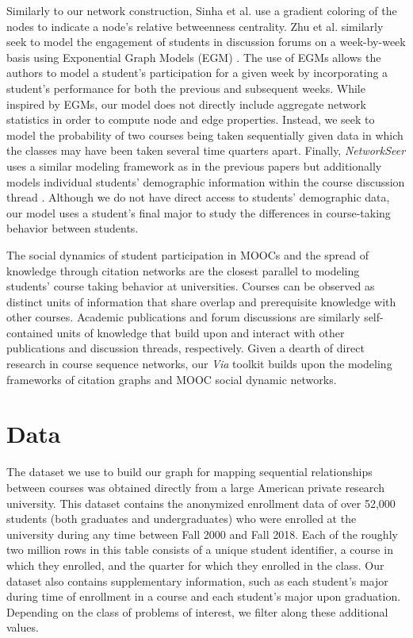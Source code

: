 \documentclass{sigchi}
\begin{document}
Similarly to our network construction, Sinha et al. use a gradient coloring of the nodes to indicate a node's relative betweenness centrality. Zhu et al. similarly seek to model the engagement of students in discussion forums on a week-by-week basis using Exponential Graph Models (EGM) \cite{Zhu2016}. The use of EGMs allows the authors to model a student's participation for a given week by incorporating a student's performance for both the previous and subsequent weeks. While inspired by EGMs, our model does not directly include aggregate network statistics in order to compute node and edge properties. Instead, we seek to model the probability of two courses being taken sequentially given data in which the classes may have been taken several time quarters apart. Finally, \textit{NetworkSeer} uses a similar modeling framework as in the previous papers but additionally models individual students' demographic information within the course discussion thread \cite{Wu2016}. Although we do not have direct access to students' demographic data, our model uses a student's final major to study the differences in course-taking behavior between students.


The social dynamics of student participation in MOOCs and the spread of knowledge through citation networks are the closest parallel to modeling students' course taking behavior at universities. Courses can be observed as distinct units of information that share overlap and prerequisite knowledge with other courses. Academic publications and forum discussions are similarly self-contained units of knowledge that build upon and interact with other publications and discussion threads, respectively. Given a dearth of direct research in course sequence networks, our \textit{Via} toolkit builds upon the modeling frameworks of citation graphs and MOOC social dynamic networks.

\section{Data}
\label{sec:data}
The dataset we use to build our graph for mapping sequential relationships between courses was obtained directly from a large American private research university. This dataset contains the anonymized enrollment data of over 52,000 students (both graduates and undergraduates) who were enrolled at the university during any time between Fall 2000 and Fall 2018. Each of the roughly two million rows in this table consists of  a unique student identifier,  a course in which they enrolled, and the quarter for which they enrolled in the class. Our dataset also contains supplementary information, such as each student's major during time of enrollment in a course and each student's major upon graduation. Depending on the class of problems of interest, we filter along these additional values.
\end{document}
